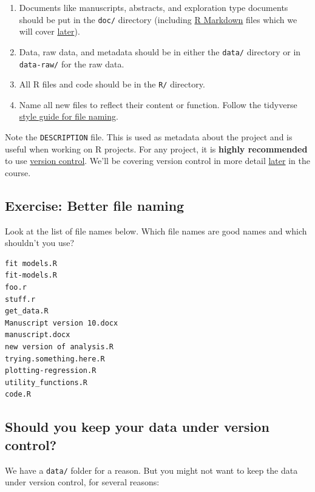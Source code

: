 \documentclass[]{Nemilov}
\providecommand{\tightlist}{%
  \setlength{\itemsep}{0pt}\setlength{\parskip}{0pt}}
\begin{document}
\begin{enumerate}
\def\labelenumi{\arabic{enumi}.}
\tightlist
\item
  Documents like manuscripts, abstracts, and exploration type documents should
  be put in the \texttt{doc/} directory (including \href{https://rmarkdown.rstudio.com/}{R Markdown} files which
  we will cover \protect\hyperlink{r-markdown}{later}).
\item
  Data, raw data, and metadata should be in either the \texttt{data/} directory or
  in \texttt{data-raw/} for the raw data.
\item
  All R files and code should be in the \texttt{R/} directory.
\item
  Name all new files to reflect their content or function. Follow the tidyverse
  \href{https://style.tidyverse.org/files.html}{style guide for file naming}.
\end{enumerate}

Note the \texttt{DESCRIPTION} file. This is used as metadata about the project and is
useful when working on R projects. For any project, it is \textbf{highly recommended}
to use \protect\hyperlink{version-control}{version control}. We'll be covering version control in more detail
\protect\hyperlink{version-control}{later} in the course.

\hypertarget{exercise-better-file-naming}{%
\subsection{Exercise: Better file naming}\label{exercise-better-file-naming}}

Look at the list of file names below. Which file names are good names and which
shouldn't you use?

\begin{verbatim}
fit models.R
fit-models.R
foo.r
stuff.r
get_data.R
Manuscript version 10.docx
manuscript.docx
new version of analysis.R
trying.something.here.R
plotting-regression.R
utility_functions.R
code.R
\end{verbatim}

\hypertarget{should-you-keep-your-data-under-version-control}{%
\subsection{Should you keep your data under version control?}\label{should-you-keep-your-data-under-version-control}}

We have a \texttt{data/} folder for a reason. But you might not want to keep the data
under version control, for several reasons:
\end{document}
